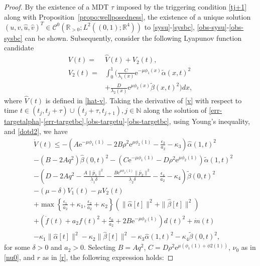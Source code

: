 \documentclass[letterpaper, 10 pt, conference]{ieeeconf}
\begin{document}
\begin{proof}
    By the existence of a MDT $\tau$ imposed by the triggering condition \eqref{tj+1} along with Proposition~\ref{propo:wellposedness}, the existence of a unique solution $(u, v, \hat u, \hat v)^T\in\mathcal{C}^0(\mathbb{R}_{>0};L^2((0,1);\mathbb{R}^4))$ to \eqref{sysu}-\eqref{sysbc}, \eqref{obs-sysu}-\eqref{obs-sysbc} can be shown. Subsequently, consider the following Lyapunov function candidate
    \begin{align}
        V(t) =& \hat V(t) + V_2(t), \label{v}\\
        V_2(t) =& \int_0^1 \bigg(\frac{C}{\lambda_1(x)}\mathrm{e}^{-\mu\phi_1(x)}\tilde \alpha(x,t)^2\\
        &+\frac{D}{\lambda_2(x)}\mathrm{e}^{\mu\phi_2(x)}\tilde \beta(x,t)^2\bigg)dx,\label{v2}
    \end{align}
    where $\hat V(t)$ is defined in \eqref{hat-v}. Taking the derivative of \eqref{v} with respect to time $t\in(t_j,t_j+\tau)\cup(t_j+\tau,t_{j+1}),j\in\mathbb{N}$ along the solution of \eqref{err-targetalpha}-\eqref{err-targetbc},\eqref{obs-targetu}-\eqref{obs-targetbc}, using Young's inequality, and \eqref{dotd2}, we have
    \begin{align*}
        &\dot V(t) \leq -\left(A\mathrm{e}^{-\mu\phi_1(1)} - 2B\rho^2\mathrm{e}^{\mu\phi_2(1)}-\tfrac{\epsilon_3}{a_2} - \kappa_3\right)\hat \alpha(1,t)^2\\
        &-\left(B-2Aq^2\right)\hat \beta(0,t)^2 - \left(C\mathrm{e}^{-\mu\phi_1(1)} - D\rho^2\mathrm{e}^{\mu\phi_2(1)}\right)\tilde \alpha(1,t)^2\\
        &-\left(D - 2Aq^2 - \tfrac{A\|\bar p_1\|^2}{\underline{\lambda}_1\delta} - \tfrac{B\mathrm{e}^{\mu\phi_2(1)}\|\bar p_2\|^2}{\underline{\lambda}_2\delta} - \tfrac{\epsilon_4}{a_2} - \kappa_4\right)\tilde \beta(0,t)^2\\
        &-(\mu-\delta)V_1(t) - \mu V_2(t)\\
        &+ \max\left\{\tfrac{\epsilon_1}{a_2} + \kappa_1,\tfrac{\epsilon_2}{a_2} + \kappa_2\right\}(\|\hat \alpha[t]\|^2 + \|\hat \beta[t]\|^2)\\
        &+\left(\dot f(t) + a_2f(t)^2+ \tfrac{\epsilon_0}{a_2} + 2B\mathrm{e}^{-\mu\phi_2(1)}\right)d(t)^2 + \dot m(t)\\
        & - \kappa_1\|\hat \alpha[t]\|^2 - \kappa_2\|\hat \beta[t]\|^2 - \kappa_3\hat \alpha(1,t)^2 - \kappa_4\tilde \beta(0,t)^2,
    \end{align*}
    for some $\delta>0$ and $a_2>0$. Selecting $B=Aq^2$, $C=D\rho^2\mathrm{e}^{\mu\left(\phi_1(1)+\phi2(1)\right)}$, $\nu_0$ as in \eqref{nu0}, and $r$ as in \eqref{r}, the following expression holds:

\end{proof}
\end{document}
